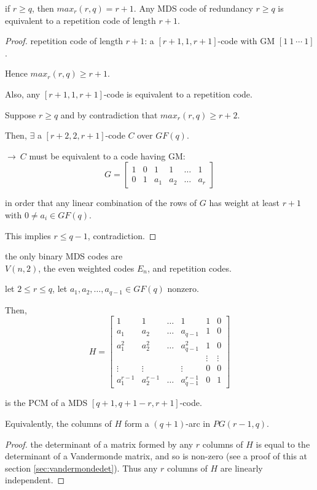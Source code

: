 \documentclass{article}
\theoremstyle{definition}
\newenvironment{thm}[1]
{\renewcommand\theinnerthm{#1}\innerthm}
{\endinnerthm}
\newenvironment{remark}[1]
{\renewcommand\theinnerrem{#1}\innerrem}
{\endinnerrem}
\begin{document}
\begin{thm}{15.3}
  if $r\geq q$, then $max_r(r,q)=r+1$. Any MDS code of redundancy $r\geq q$ is equivalent to a repetition code of length $r+1$.
\end{thm}
\begin{proof}
  repetition code of length $r+1$: a $[r+1, 1, r+1]$-code with GM $[1~1~\cdots~1]$.

  Hence $max_r(r,q) \geq r+1$.

  Also, any $[r+1, 1, r+1]$-code is equivalent to a repetition code.

  Suppose $r \geq q$ and by contradiction that $max_r(r,q) \geq r+2$.

  Then, $\exists$ a $[r+2, 2, r+1]$-code $C$ over $GF(q)$.

  $\longrightarrow~C$ must be equivalent to a code having GM:
  $$G=
  \begin{bmatrix}
    1 & 0 & 1 & 1 & \ldots & 1\\
    0 & 1 & a_1 & a_2 & \ldots & a_r
  \end{bmatrix}
  $$

  in order that any linear combination of the rows of $G$ has weight at least $r+1$ with $0 \neq a_i \in GF(q)$.

  This implies $r \leq q-1$, contradiction.
\end{proof}

\begin{remark}{}
  the only binary MDS codes are\\
  $V(n,2)$, the even weighted codes $E_n$, and repetition codes.
\end{remark}

\begin{thm}{15.4}
  let $2 \leq r \leq q$, let $a_1, a_2, \ldots, a_{q-1} \in GF(q)$ nonzero.

  Then,
  $$
  H =
  \begin{bmatrix}
    1 & 1 & \ldots & 1 & 1 & 0\\
    a_1 & a_2 & \ldots & a_{q-1} & 1 & 0\\
    a_1^2 & a_2^2 & \ldots & a_{q-1}^2 & 1 & 0\\
     & & & & \vdots & \vdots\\
    \vdots & \vdots & & \vdots & 0 & 0\\
    a_1^{r-1} & a_2^{r-1} & \ldots & a_{q-1}^{r-1} & 0 & 1
  \end{bmatrix}
  $$

  is the PCM of a MDS $[q+1, q+1-r, r+1]$-code.

  Equivalently, the columns of $H$ form a $(q+1)$-arc in $PG(r-1, q)$.
\end{thm}
\begin{proof}
  the determinant of a matrix formed by any $r$ columns of $H$ is equal to the determinant of a Vandermonde matrix, and so is non-zero (see a proof of this at section \ref{sec:vandermondedet}).
  Thus any $r$ columns of $H$ are linearly independent.
\end{proof}
\end{document}
